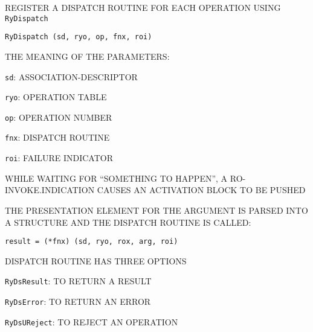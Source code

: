 \begin{bwslide}

\begin{nrtc}
\item	REGISTER A DISPATCH ROUTINE FOR EACH OPERATION USING \verb"RyDispatch"
\begin{verbatim}
RyDispatch (sd, ryo, op, fnx, roi)
\end{verbatim}

\item	THE MEANING OF THE PARAMETERS:
    \begin{nrtc}
    \item	\verb"sd": ASSOCIATION-DESCRIPTOR

    \item	\verb"ryo": OPERATION TABLE

    \item	\verb"op": OPERATION NUMBER

    \item	\verb"fnx": DISPATCH ROUTINE

    \item	\verb"roi": FAILURE INDICATOR
    \end{nrtc}
\end{nrtc}
\end{bwslide}


\begin{bwslide}

\begin{nrtc}
\item	WHILE WAITING FOR ``SOMETHING TO HAPPEN'', A RO-INVOKE.INDICATION
	CAUSES AN ACTIVATION BLOCK TO BE PUSHED

\item	THE PRESENTATION ELEMENT FOR THE ARGUMENT IS PARSED INTO A STRUCTURE
	AND THE DISPATCH ROUTINE IS CALLED:
\begin{verbatim}
result = (*fnx) (sd, ryo, rox, arg, roi)    
\end{verbatim}

\item	DISPATCH ROUTINE HAS THREE OPTIONS
    \begin{nrtc}
    \item	\verb"RyDsResult": TO RETURN A RESULT

    \item	\verb"RyDsError": TO RETURN AN ERROR

    \item	\verb"RyDsUReject": TO REJECT AN OPERATION
    \end{nrtc}
\end{nrtc}
\end{bwslide}


